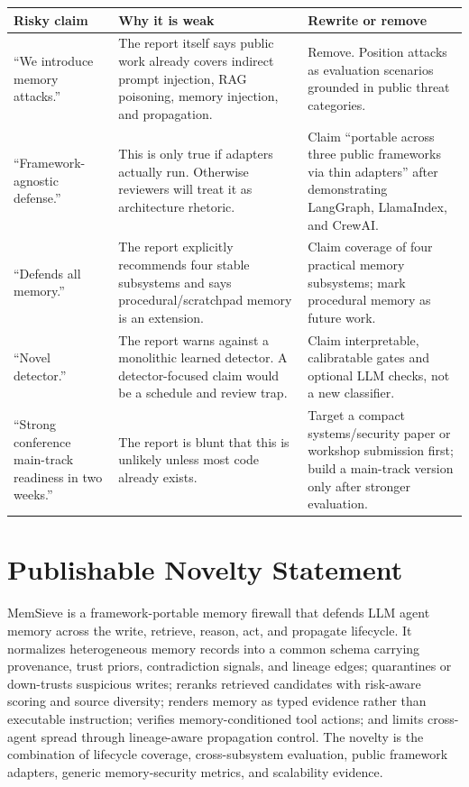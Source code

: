 \documentclass[11pt,oneside]{report}
\newcommand{\project}{MemSieve}
\begin{document}
\begin{longtable}{|L{0.23\textwidth}|L{0.34\textwidth}|L{0.33\textwidth}|}
\hline
\textbf{Risky claim} & \textbf{Why it is weak} & \textbf{Rewrite or remove} \\
\hline
``We introduce memory attacks.'' & The report itself says public work already covers indirect
prompt injection, RAG poisoning, memory injection, and propagation. & Remove. Position attacks as
evaluation scenarios grounded in public threat categories. \\
\hline
``Framework-agnostic defense.'' & This is only true if adapters actually run. Otherwise reviewers
will treat it as architecture rhetoric. & Claim ``portable across three public frameworks via thin
adapters'' after demonstrating LangGraph, LlamaIndex, and CrewAI. \\
\hline
``Defends all memory.'' & The report explicitly recommends four stable subsystems and says
procedural/scratchpad memory is an extension. & Claim coverage of four practical memory subsystems;
mark procedural memory as future work. \\
\hline
``Novel detector.'' & The report warns against a monolithic learned detector. A detector-focused
claim would be a schedule and review trap. & Claim interpretable, calibratable gates and optional
LLM checks, not a new classifier. \\
\hline
``Strong conference main-track readiness in two weeks.'' & The report is blunt that this is
unlikely unless most code already exists. & Target a compact systems/security paper or workshop
submission first; build a main-track version only after stronger evaluation. \\
\hline
\end{longtable}

\section{Publishable Novelty Statement}

\project{} is a framework-portable memory firewall that defends LLM agent memory across the
write, retrieve, reason, act, and propagate lifecycle. It normalizes heterogeneous memory records
into a common schema carrying provenance, trust priors, contradiction signals, and lineage edges;
quarantines or down-trusts suspicious writes; reranks retrieved candidates with risk-aware scoring
and source diversity; renders memory as typed evidence rather than executable instruction; verifies
memory-conditioned tool actions; and limits cross-agent spread through lineage-aware propagation
control. The novelty is the combination of lifecycle coverage, cross-subsystem evaluation, public
framework adapters, generic memory-security metrics, and scalability evidence.
\end{document}
